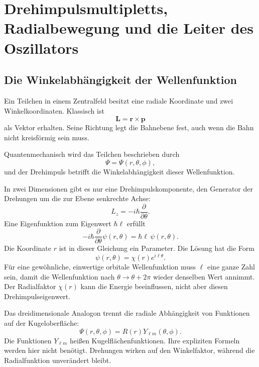 \chapter{Drehimpulsmultipletts, Radialbewegung und die Leiter des Oszillators}

\section{Die Winkelabhängigkeit der Wellenfunktion}

Ein Teilchen in einem Zentralfeld besitzt eine radiale Koordinate und zwei Winkelkoordinaten. Klassisch ist
\begin{equation}
\mathbf L=\mathbf r\times\mathbf p
\end{equation}
als Vektor erhalten. Seine Richtung legt die Bahnebene fest, auch wenn die Bahn nicht kreisförmig sein muss.

Quantenmechanisch wird das Teilchen beschrieben durch
\begin{equation}
\Psi=\Psi(r,\theta,\phi),
\end{equation}
und der Drehimpuls betrifft die Winkelabhängigkeit dieser Wellenfunktion.

In zwei Dimensionen gibt es nur eine Drehimpulskomponente, den Generator der Drehungen um die zur Ebene senkrechte Achse:
\begin{equation}
L_z=-i\hbar\frac{\partial}{\partial\theta}.
\end{equation}
Eine Eigenfunktion zum Eigenwert \(\hbar\ell\) erfüllt
\begin{equation}
-i\hbar\frac{\partial}{\partial\theta}\psi(r,\theta)
=\hbar\ell\,\psi(r,\theta).
\end{equation}
Die Koordinate \(r\) ist in dieser Gleichung ein Parameter. Die Lösung hat die Form
\begin{equation}
\psi(r,\theta)=\chi(r)e^{i\ell\theta}.
\end{equation}
Für eine gewöhnliche, einwertige orbitale Wellenfunktion muss \(\ell\) eine ganze Zahl sein, damit die Wellenfunktion nach \(\theta\to\theta+2\pi\) wieder denselben Wert annimmt. Der Radialfaktor \(\chi(r)\) kann die Energie beeinflussen, nicht aber diesen Drehimpulseigenwert.

Das dreidimensionale Analogon trennt die radiale Abhängigkeit von Funktionen auf der Kugeloberfläche:
\begin{equation}
\Psi(r,\theta,\phi)=R(r)Y_{\ell m}(\theta,\phi).
\end{equation}
Die Funktionen \(Y_{\ell m}\) heißen Kugelflächenfunktionen. Ihre expliziten Formeln werden hier nicht benötigt. Drehungen wirken auf den Winkelfaktor, während die Radialfunktion unverändert bleibt.

